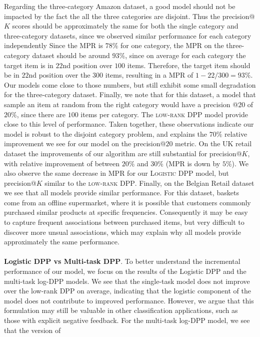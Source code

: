 Regarding the three-category Amazon dataset, a good model should not be impacted
by the fact the all the three categories are disjoint. Thus the precision@$K$
scores should be approximately the same for both the single category and
three-category datasets, since we observed similar performance for each category
independently Since the MPR is $78\%$ for one category, the MPR on the
three-category dataset should be around $93\%$, since on average for each
category the target item is in $22$nd position over $100$ items. Therefore, the
target item should be in $22$nd position over the $300$ items, resulting in a
MPR of $1-22/300 = 93\%$. Our models come close to those numbers, but still
exhibit some small degradation for the three-category dataset. Finally, we note
that for this dataset, a model that sample an item at random from the right
category would have a precision @$20$ of $20\%$, since there are $100$ items per
category. The \textsc{low-rank DPP} model provide close to this level of
performance. Taken together, these observations indicate our model is robust to
the disjoint category problem, and explains the $70\%$ relative improvement we see for our
model on the precision@$20$ metric. On the UK retail dataset the improvements of
our algorithm are still substantial for precision@$K$, with relative improvement
of between $20\%$ and $30\%$ (MPR is down by $5\%$). We also observe the same
decrease in MPR for our \textsc{Logistic DPP} model, but precision@$K$
similar to the \textsc{low-rank DPP}. Finally, on the Belgian Retail dataset we
see that all models provide similar performance. For this dataset, baskets come
from an offline supermarket, where it is possible that customers commonly
purchased similar products at specific frequencies. Consequently it may be easy
to capture frequent associations between purchased items, but very difficult to
discover more unsual associations, which may explain why all models provide
approximately the same performance.
\\
\\
\noindent
\textbf{Logistic DPP vs Multi-task DPP}.
To better understand the incremental performance of our model, we focus on the
results of the Logistic DPP and the multi-task log-DPP models. We see that
the single-task model does not improve over the low-rank DPP on average,
indicating that the logistic component of the model does not contribute to
improved performance. However, we argue that this formulation may still be
valuable in other classification applications, such as those with explicit
negative feedback. For the multi-task log-DPP model, we see that the version of
